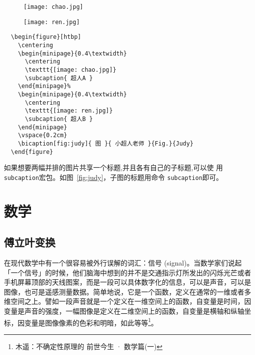 \begin{figure}[htbp]
  \centering
  \begin{minipage}{0.4\textwidth}
    \centering
    \texttt{[image: chao.jpg]}
    \label{fig:1a}
  \end{minipage}%
  \begin{minipage}{0.4\textwidth}
    \centering
    \texttt{[image: ren.jpg]}
    \label{fig:1b}
  \end{minipage}
  \vspace{0.2cm}
\end{figure}

\begin{lstlisting}
  \begin{figure}[htbp]
    \centering
    \begin{minipage}{0.4\textwidth}
      \centering
      \texttt{[image: chao.jpg]}
      \subcaption{ 超人A }
    \end{minipage}%
    \begin{minipage}{0.4\textwidth}
      \centering
      \texttt{[image: ren.jpg]}
      \subcaption{ 超人B }
    \end{minipage}
    \vspace{0.2cm}
    \bicaption[fig:judy]{ 图 }{ 小超人老师 }{Fig.}{Judy}
  \end{figure}
\end{lstlisting}

如果想要两幅并排的图片共享一个标题,并且各有自己的子标题,可以使
用\texttt{subcaption}宏包。如图~\ref{fig:judy}，子图的标题用命令
\texttt{subcaption}即可。

\section{数学}

\subsection{傅立叶变换}

在现代数学中有一个很容易被外行误解的词汇：信号 (signal)。当数学家们说起
「一个信号」的时候，他们脑海中想到的并不是交通指示灯所发出的闪烁光芒或者
手机屏幕顶部的天线图案，而是一段可以具体数字化的信息，可以是声音，可以是
图像，也可是遥感测量数据。简单地说，它是一个函数，定义在通常的一维或者多
维空间之上。譬如一段声音就是一个定义在一维空间上的函数，自变量是时间，因
变量是声音的强度，一幅图像是定义在二维空间上的函数，自变量是横轴和纵轴坐
标，因变量是图像像素的色彩和明暗，如此等等\footnote{木遥：不确定性原理的
  前世今生 · 数学篇(一)}。

